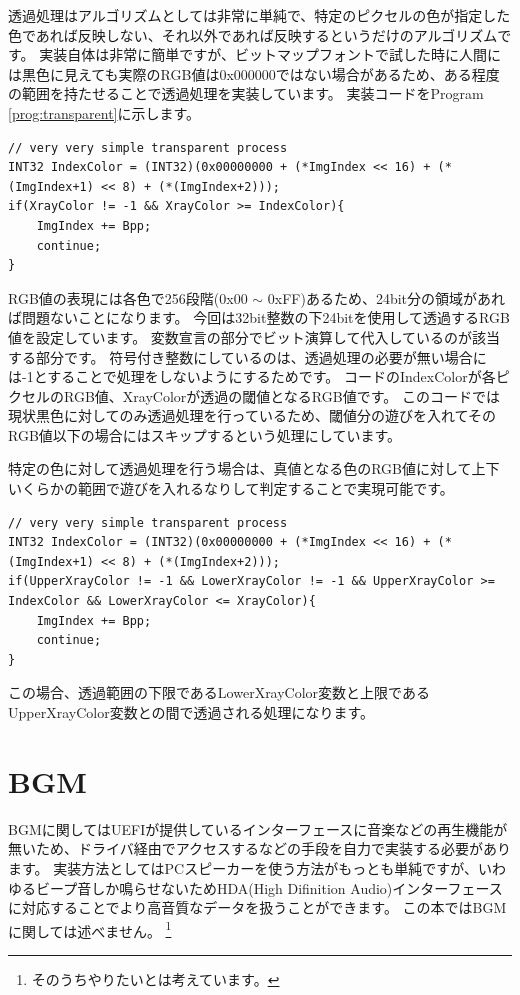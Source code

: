 \documentclass[10pt,b5paper,twoside,openany]{ltjsbook}
\begin{document}
透過処理はアルゴリズムとしては非常に単純で、特定のピクセルの色が指定した色であれば反映しない、それ以外であれば反映するというだけのアルゴリズムです。
実装自体は非常に簡単ですが、ビットマップフォントで試した時に人間には黒色に見えても実際のRGB値は0x000000ではない場合があるため、ある程度の範囲を持たせることで透過処理を実装しています。
実装コードをProgram \ref{prog:transparent}に示します。
\begin{lstlisting}[style=customC,caption=Transparent process,label=prog:transparent]
// very very simple transparent process
INT32 IndexColor = (INT32)(0x00000000 + (*ImgIndex << 16) + (*(ImgIndex+1) << 8) + (*(ImgIndex+2)));
if(XrayColor != -1 && XrayColor >= IndexColor){
    ImgIndex += Bpp;
    continue;
} 
\end{lstlisting}
RGB値の表現には各色で256段階(0x00 $\sim$ 0xFF)あるため、24bit分の領域があれば問題ないことになります。
今回は32bit整数の下24bitを使用して透過するRGB値を設定しています。
変数宣言の部分でビット演算して代入しているのが該当する部分です。
符号付き整数にしているのは、透過処理の必要が無い場合には-1とすることで処理をしないようにするためです。
コードのIndexColorが各ピクセルのRGB値、XrayColorが透過の閾値となるRGB値です。
このコードでは現状黒色に対してのみ透過処理を行っているため、閾値分の遊びを入れてそのRGB値以下の場合にはスキップするという処理にしています。

特定の色に対して透過処理を行う場合は、真値となる色のRGB値に対して上下いくらかの範囲で遊びを入れるなりして判定することで実現可能です。
\begin{lstlisting}[style=customC,caption=Transparent process,label=prog:transparent]
// very very simple transparent process
INT32 IndexColor = (INT32)(0x00000000 + (*ImgIndex << 16) + (*(ImgIndex+1) << 8) + (*(ImgIndex+2)));
if(UpperXrayColor != -1 && LowerXrayColor != -1 && UpperXrayColor >= IndexColor && LowerXrayColor <= XrayColor){
    ImgIndex += Bpp;
    continue;
} 
\end{lstlisting}
この場合、透過範囲の下限であるLowerXrayColor変数と上限であるUpperXrayColor変数との間で透過される処理になります。

\section{BGM}
BGMに関してはUEFIが提供しているインターフェースに音楽などの再生機能が無いため、ドライバ経由でアクセスするなどの手段を自力で実装する必要があります。
実装方法としてはPCスピーカーを使う方法がもっとも単純ですが、いわゆるビープ音しか鳴らせないためHDA(High Difinition Audio)インターフェースに対応することでより高音質なデータを扱うことができます。
この本ではBGMに関しては述べません。
\footnote{そのうちやりたいとは考えています。}
\end{document}
